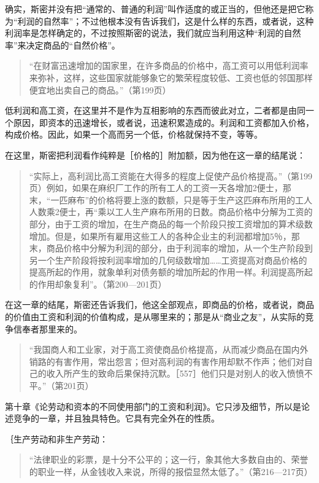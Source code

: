 确实，斯密并没有把“通常的、普通的利润”叫作适度的或正当的，但他还是把它称为“利润的自然率”；不过他根本没有告诉我们，这是什么样的东西，或者说，这种利润率是怎样确定的，不过按照斯密的说法，我们就应当利用这种“利润的自然率”来决定商品的“自然价格”。

\begin{quote}{“在财富迅速增加的国家里，在许多商品的价格中，高工资可以用低利润率来弥补，这样，这些国家就能够象它的繁荣程度较低、工资也低的邻国那样便宜地出卖自己的商品。”（第199页）}\end{quote}

低利润和高工资，在这里并不是作为互相影响的东西而彼此对立，二者都是由同一个原因，即资本的迅速增长，或者说，迅速积累造成的。利润和工资都加入价格，构成价格。因此，如果一个高而另一个低，价格就保持不变，等等。

在这里，斯密把利润看作纯粹是［价格的］附加额，因为他在这一章的结尾说：

\begin{quote}{“实际上，高利润比高工资能在大得多的程度上促使产品价格提高。”（第199页）例如，如果在麻织厂工作的所有工人的工资一天各增加2便士，那末，“一匹麻布”的价格将要上涨的数额，只是等于生产这匹麻布所用的工人人数乘2便士，再“乘以工人生产麻布所用的日数。商品价格中分解为工资的部分，由于工资的增加，在生产商品的每一个阶段只按工资增加的算术级数增加。但是，如果所有雇用这些工人的各种企业主的利润都增加5％，那末，商品价格中分解为利润的部分，由于利润率的增加，从一个生产阶段到另一个生产阶段将按利润率增加的几何级数增加……工资提高对商品价格的提高所起的作用，就象单利对债务额的增加所起的作用一样。利润提高所起的作用却象复利”。（第200—201页）}\end{quote}

在这一章的结尾，斯密还告诉我们，他这全部观点，即商品的价格，或者说，商品的价值由工资和利润的价值构成，是从哪里来的；那是从“商业之友”，从实际的竞争信奉者那里来的。

\begin{quote}{“我国商人和工业家，对于高工资使商品价格提高，从而减少商品在国内外销路的有害作用，常出怨言；但对高利润的有害作用却默不作声；他们对自己的收入所产生的致命后果保持沉默。［557］他们只是对别人的收入愤愤不平。”（第201页）}\end{quote}

第十章《论劳动和资本的不同使用部门的工资和利润》。它只涉及细节，所以是论述竞争的一章，并且独具特色。它具有完全外在的性质。

｛生产劳动和非生产劳动：

\begin{quote}{“法律职业的彩票，是十分不公平的；这一行，象其他大多数自由的、荣誉的职业一样，从金钱收入来说，所得的报偿显然太低了。”（第216—217页）}\end{quote}

